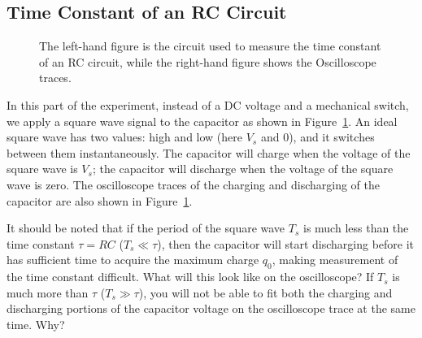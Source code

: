 \documentclass[12pt]{article}
\begin{document}
\subsection{Time Constant of an RC Circuit}
\label{sec:timeconst}


\begin{figure}
  \centering
   \qquad
  \caption{The left-hand figure is the circuit used to measure the
    time constant of an RC circuit, while the right-hand figure shows
    the Oscilloscope traces.}
  \label{fig:RCmeasuring}
\end{figure}
In this part of the experiment, instead of a DC voltage and a
mechanical switch, we apply a square wave signal to the capacitor as
shown in Figure~\ref{fig:RCmeasuring}.  An ideal square wave has two
values: high and low (here $V_s$ and 0), and it switches between them
instantaneously.  The capacitor will charge when the voltage of the
square wave is $V_s$; the capacitor will discharge when the voltage of
the square wave is zero.  The oscilloscope traces of the charging and
discharging of the capacitor are also shown in
Figure~\ref{fig:RCmeasuring}.

It should be noted that if the period of the square wave $T_s$ is much
less than the time constant $\tau = RC$ ($T_s \ll \tau$), then the
capacitor will start discharging before it has sufficient time to
acquire the maximum charge $q_0$, making measurement of the time
constant difficult.  What will this look like on the oscilloscope?  If
$T_s$ is much more than $\tau$ ($T_s \gg \tau$), you will not be able
to fit both the charging and discharging portions of the capacitor
voltage on the oscilloscope trace at the same time.  Why?
\end{document}
